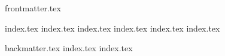 \documentclass[]{template/lnucsthesis}
\begin{document}
\raggedright
\frontmatter
  {frontmatter.tex}
 
\mainmatter
  {index.tex}
  {index.tex}
  {index.tex}
  {index.tex}
  {index.tex}
  {index.tex}

\backmatter
  {backmatter.tex}
  {index.tex}
  {index.tex}
\end{document}
